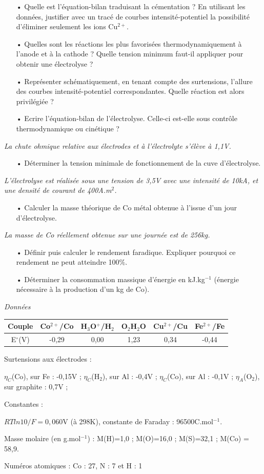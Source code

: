 \documentclass{report}
\begin{document}
\begin{itemize}
	\item[•] Quelle est l'équation-bilan traduisant la cémentation ? En utilisant les données, justifier avec un tracé de courbes intensité-potentiel la possibilité d'éliminer seulement les ions Cu$^{2+}$. 
	\item[•] Quelles sont les réactions les plus favorisées thermodynamiquement à l'anode et à la cathode ? Quelle tension minimum faut-il appliquer pour obtenir une électrolyse ? 
	\item[•] Représenter schématiquement, en tenant compte des surtensions, l'allure des courbes intensité-potentiel correspondantes. Quelle réaction est alors privilégiée ?
	\item[•] Ecrire l'équation-bilan de l'électrolyse. Celle-ci est-elle sous contrôle thermodynamique ou cinétique ?
\end{itemize}
\textit{La chute ohmique relative aux électrodes et à l'électrolyte s'élève à 1,1V.}
\begin{itemize}
	\item[•] Déterminer la tension minimale de fonctionnement de la cuve d'électrolyse. 
\end{itemize}
\textit{L'électrolyse est réalisée sous une tension de 3,5V avec une intensité de 10kA, et une densité de courant de 400A.m$^2$.}
\begin{itemize}
	\item[•] Calculer la masse théorique de Co métal obtenue à l'issue d'un jour d'électrolyse. 
\end{itemize}
\textit{La masse de Co réellement obtenue sur une journée est de 256kg.}
\begin{itemize}
	\item[•] Définir puis calculer le rendement faradique. Expliquer pourquoi ce rendement ne peut atteindre 100$\%$.
	\item[•] Déterminer la consommation massique d'énergie en kJ.kg$^{-1}$ (énergie nécessaire à la production d'un kg de Co).
\end{itemize}

\textit{Données}

\vspace{0,2cm}
\begin{tabular}{|c|c|c|c|c|c|}
\hline
Couple & Co$^{2+}$/Co &  H$_3$O$^{+}$/H$_2$ & O$_2$H$_2$O & Cu$^{2+}$/Cu & Fe$^{2+}$/Fe\\
\hline
E$^\circ$(V) & -0,29 & 0,00 & 1,23 & 0,34 & -0,44\\
\hline
\end{tabular}

Surtensions aux électrodes : 

$\eta_C$(Co), sur Fe : -0,15V ;
$\eta_C$(H$_2$), sur Al : -0,4V ;
$\eta_C$(Co), sur Al : -0,1V ;
$\eta_A$(O$_2$), sur graphite : 0,7V ;

Constantes : 

$RTln10/F=0,060$V (à 298K), constante de Faraday : 96500C.mol$^{-1}$.

Masse molaire (en g.mol$^{-1}$) : M(H)=1,0 ; M(O)=16,0 ; M(S)=32,1 ; M(Co) = 58,9. 

Numéros atomiques : Co : 27, N : 7 et H : 1
\end{document}
